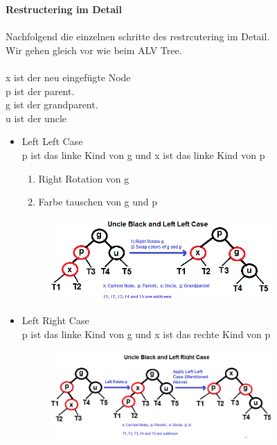 \documentclass[a4paper,10pt]{report}
\begin{document}
\begin{enumerate}
\begin{enumerate}
\begin{figure}[H]
\begin{center}
				\end{center}
			\end{figure}
			\newpage
			\textbf{Restructering im Detail}\\
			\\
			Nachfolgend die einzelnen schritte des restrcutering im Detail.\\
			Wir gehen gleich vor wie beim ALV Tree.\\
			\\
			x ist der neu eingefügte Node\\
			p ist der parent.\\
			g ist der grandparent.\\
			u ist der uncle\\
			\begin{itemize}
				\item
				Left Left Case\\
				p ist das linke Kind von g und x ist das linke Kind von p
				\begin{enumerate}
					\item Right Rotation von g
					\item Farbe tauschen von g und p
				\end{enumerate}
				\begin{figure}[H]
					\begin{center}
  						\includegraphics[width=0.8\textwidth]{img/leftleft.png}
					\end{center}
				\end{figure}
				\item
				Left Right Case\\
				p ist das linke Kind von g und x ist das rechte Kind von p
				\begin{figure}[H]
					\begin{center}
  						\includegraphics[width=0.8\textwidth]{img/leftright.png}

\end{center}
\end{figure}
\end{itemize}
\end{enumerate}
\end{enumerate}
\end{document}
